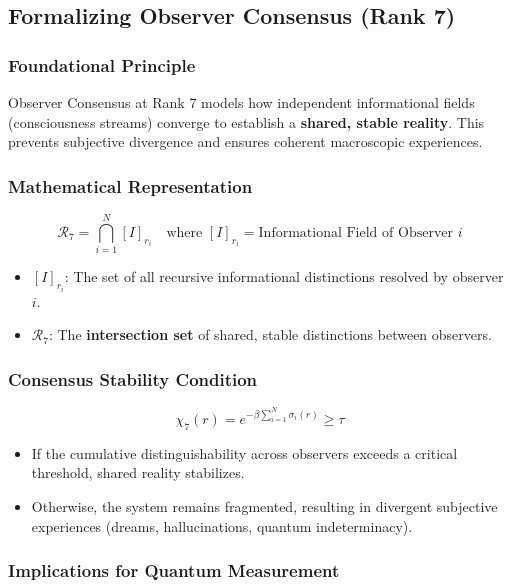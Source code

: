 \documentclass[12pt,a4paper]{article}
\begin{document}
\subsection{Formalizing Observer Consensus (Rank 7)}

\subsubsection*{Foundational Principle}

Observer Consensus at Rank 7 models how independent informational fields (consciousness streams) converge to establish a \textbf{shared, stable reality}. This prevents subjective divergence and ensures coherent macroscopic experiences.

\subsubsection*{Mathematical Representation}

\[
\mathcal{R}_7 = \bigcap_{i=1}^{N} [I]_{r_i} \quad \text{where } [I]_{r_i} = \text{Informational Field of Observer } i
\]

\begin{itemize}
    \item \([I]_{r_i}\): The set of all recursive informational distinctions resolved by observer \(i\).
    \item \(\mathcal{R}_7\): The \textbf{intersection set} of shared, stable distinctions between observers.
\end{itemize}

\subsubsection*{Consensus Stability Condition}

\[
\chi_7(r) = e^{-\beta \sum_{i=1}^{N} \sigma_i(r)} \geq \tau
\]

\begin{itemize}
    \item If the cumulative distinguishability across observers exceeds a critical threshold, shared reality stabilizes.
    \item Otherwise, the system remains fragmented, resulting in divergent subjective experiences (dreams, hallucinations, quantum indeterminacy).
\end{itemize}

\subsubsection*{Implications for Quantum Measurement}
\end{document}

